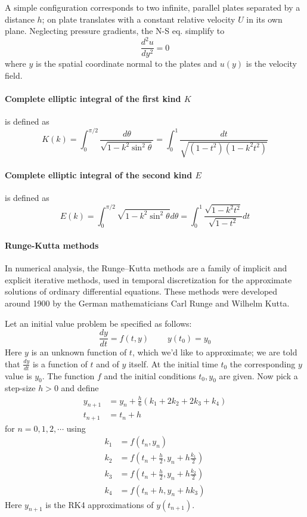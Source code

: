 \documentclass[books,12pt]{elegantpaper}
\newcommand{\tens}{\ \ \ \ \ \ \ \ \ \ }
\begin{document}
A simple configuration corresponds to two infinite, parallel plates separated by a distance $h$; on plate translates with a constant relative velocity $U$ in its own plane. Neglecting pressure gradients, the N-S eq. simplify to 
$$ \frac{d^2 u}{d y^2} = 0 $$
where $y$ is the spatial coordinate normal to the plates and $u(y)$ is the velocity field. 


\paragraph{Complete elliptic integral of the first kind $K$} is defined as
$$ K(k) = \int_0^{\pi/2} \frac{d\theta}{\sqrt{1-k^2\sin^2\theta}} = \int_0^1 \frac{dt}{\sqrt{(1-t^2)(1-k^2t^2)}} $$

\paragraph{Complete elliptic integral of the second kind $E$} is defined as
$$ E(k) = \int_0^{\pi/2} \sqrt{1-k^2\sin^2\theta} d\theta = \int_0^1 \frac{\sqrt{1-k^2t^2}}{\sqrt{1-t^2}} dt $$


\paragraph{Runge-Kutta methods} 
In numerical analysis, the Runge–Kutta methods are a family of implicit and explicit iterative methods, used in temporal discretization for the approximate solutions of ordinary differential equations. These methods were developed around 1900 by the German mathematicians Carl Runge and Wilhelm Kutta.

Let an initial value problem be specified as follows:
$$ \frac{dy}{dt} = f(t,y) \tens y(t_0) = y_0 $$
Here $y$ is an unknown function of $t$, which we'd like to approximate; we are told that $\frac{dy}{dt}$ is a function of $t$ and of $y$ itself. At the initial time $t_0$ the corresponding $y$ value is $y_0$. The function $f$ and the initial conditions $t_0, y_0$ are given. Now pick a step-size $h>0$ and define
$$ \begin{align}
y_{n+1} &= y_n + \frac{h}{6} (k_1 + 2k_2 + 2k_3 + k_4) \\
t_{n+1} &= t_n + h 
\end{align} $$
for $n=0,1,2,\cdots$ using
$$ \begin{align}
k_1 &= f(t_n,y_n) \\
k_2 &= f\left( t_n + \frac{h}{2} , y_n + h \frac{k_1}{2} \right) \\
k_3 &= f\left( t_n + \frac{h}{2} , y_n + h \frac{k_2}{2} \right) \\
k_4 &= f(t_n + h , y_n + hk_3) 
\end{align} $$
Here $y_{n+1}$ is the RK4 approximations of $y(t_{n+1})$.
\end{document}
